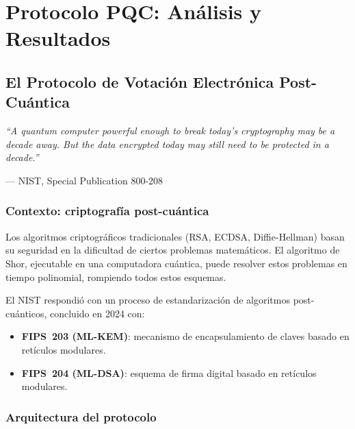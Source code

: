 \documentclass[12pt, a4paper, twoside, openright]{book}
\begin{document}
\part{Protocolo PQC: An\'alisis y Resultados}

\chapter{El Protocolo de Votaci\'on Electr\'onica Post-Cu\'antica}

\epigraph{%
  \textit{``A quantum computer powerful enough to break today's
  cryptography may be a decade away. But the data encrypted today
  may still need to be protected in a decade.''}
}{--- NIST, Special Publication 800-208}

\section{Contexto: criptograf\'ia post-cu\'antica}

Los algoritmos criptogr\'aficos tradicionales (RSA, ECDSA, Diffie-Hellman)
basan su seguridad en la dificultad de ciertos problemas matem\'aticos.
El algoritmo de Shor, ejecutable en una computadora cu\'antica,
puede resolver estos problemas en tiempo polinomial, rompiendo todos
estos esquemas.

\medskip

El NIST respondi\'o con un proceso de estandarizaci\'on de algoritmos
post-cu\'anticos, concluido en 2024 con:
\begin{itemize}[itemsep=3pt]
  \item \textbf{FIPS~203 (ML-KEM)}: mecanismo de encapsulamiento de
    claves basado en ret\'iculos modulares.
  \item \textbf{FIPS~204 (ML-DSA)}: esquema de firma digital basado
    en ret\'iculos modulares.
\end{itemize}

\section{Arquitectura del protocolo}
\end{document}
